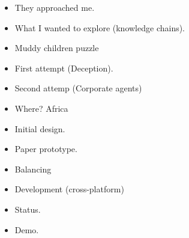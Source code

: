 \documentclass[12pt]{article}
\begin{document}
{\Huge

\begin{itemize}


\item They approached me.

\item What I wanted to explore (knowledge chains).

\item Muddy children puzzle

\item First attempt (Deception).

\item Second attemp (Corporate agents)

\item Where?  Africa

\item Initial design.

\item Paper prototype.

\item Balancing

\item Development (cross-platform)

\item Status.

\item Demo.

\end{itemize}
}
\end{document}
